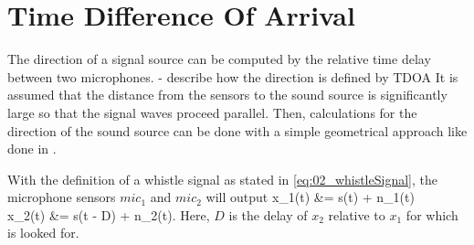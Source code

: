 \section{Time Difference Of Arrival}

The direction of a signal source can be computed by the relative time delay between
two microphones.
- describe how the direction is defined by TDOA
It is assumed that the distance from the sensors to the sound source is
significantly large so that the signal waves proceed parallel.
Then, calculations for the direction of the sound source can be done with a simple
geometrical approach like done in \cite{Valin_Michaud}.

With the definition of a whistle signal as stated in \ref{eq:02_whistleSignal},
the microphone sensors $mic_1$ and $mic_2$ will output
\bsub \bal
    x_1(t) &= s(t) + n_1(t)\\
    x_2(t) &= \alpha s(t - D) + n_2(t).
\eal \esub
\label{eq:02_signalTimeDomain}
Here, $D$ is the delay of $x_2$ relative to $x_1$ for which is looked for.